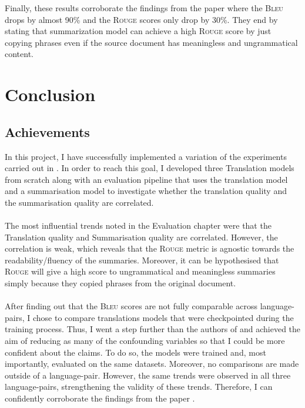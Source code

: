 \documentclass[12pt,a4paper,twoside,openright]{report}
\newcommand{\bleu}{\textsc{Bleu} }
\newcommand{\rouge}{\textsc{Rouge} }
\begin{document}
Finally, these results corroborate the findings from the paper\cite{nguyen-daume-iii-2019-global} where the \bleu drops by almost 90\% and the \rouge scores only drop by 30\%. They end by stating that summarization model can achieve a high \rouge score by just copying phrases even if the source document has meaningless and ungrammatical content.










\chapter{Conclusion}
\label{conclusion}

\section*{Achievements}
\label{achievements}
In this project, I have successfully implemented a variation of the experiments carried out in \cite{nguyen-daume-iii-2019-global}. In order to reach this goal, I developed three Translation models from scratch along with an evaluation pipeline that uses the translation model and a summarisation model to investigate whether the translation quality and the summarisation quality are correlated.
\\\\
The most influential trends noted in the Evaluation chapter were that the Translation quality and Summarisation quality are correlated.
However, the correlation is weak, which reveals that the \rouge metric is agnostic towards the readability/fluency of the summaries. Moreover, it can be hypothesised that \rouge will give a high score to ungrammatical and meaningless summaries simply because they copied phrases from the original document.
\\\\
After finding out that the \bleu scores are not fully comparable across language-pairs,
I chose to compare translations models that were checkpointed during the training process. Thus, I went a step further than the authors of \cite{nguyen-daume-iii-2019-global} and achieved the aim of reducing as many of the confounding variables so that I could be more confident about the claims.
To do so, the models were trained and, most importantly, evaluated on the same datasets.
Moreover, no comparisons are made outside of a language-pair. However, the same trends were observed in all three language-pairs, strengthening the validity of these trends.
Therefore, I can confidently corroborate the findings from the paper \cite{nguyen-daume-iii-2019-global}.
\end{document}
